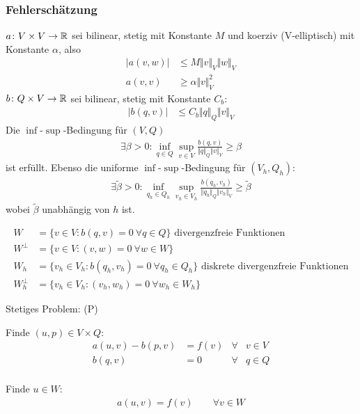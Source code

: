 \subsubsection*{Fehlerschätzung}
$a\colon V\times V\to\mathbb{R}$ sei bilinear, stetig mit Konstante $M$ und koerziv (V-elliptisch) mit Konstante $\alpha$, also
\begin{align*}
	\big|a(v,w)\big|&\leq M\Vert v\Vert_V\Vert w\Vert_V\\
	a(v,v)&\geq\alpha\Vert v\Vert_V^2
\end{align*}
$b\colon Q\times V\to\mathbb{R}$ sei bilinear, stetig mit Konstante $C_b$:
\begin{align*}
	\big|b(q,v)\big|&\leq C_b\Vert q\Vert_Q\Vert v\Vert_V
\end{align*}
Die $\inf$-$\sup$-Bedingung für $(V,Q)$
\begin{align*}
	\exists\beta>0:\inf\limits_{q\in Q}\sup\limits_{v\in V}\frac{b(q,v)}{\Vert q\Vert_Q\Vert v\Vert_V}\geq\beta
\end{align*}
ist erfüllt. Ebenso die uniforme $\inf$-$\sup$-Bedingung für $(V_h,Q_h)$:
\begin{align*}
	\exists\tilde{\beta}>0:\inf\limits_{q_h\in Q_h}\sup\limits_{v_h\in V_h}\frac{b(q_h,v_h)}{\Vert q_h\Vert_Q\Vert v_h\Vert_V}\geq\tilde{\beta}
\end{align*}
wobei $\tilde{\beta}$ unabhängig von $h$ ist.

\begin{align*}
	W&=\Big\lbrace v\in V:b(q,v)=0~\forall q\in Q\Big\rbrace\text{ divergenzfreie Funktionen}\\
	W^\perp&=\Big\lbrace v\in V:(v,w)=0~\forall w\in W\Big\rbrace\\
	W_h&=\Big\lbrace v_h\in V_h:b(q_h,v_h)=0~\forall q_h\in Q_h\Big\rbrace\text{ diskrete divergenzfreie Funktionen}\\
	W_h^\perp&=\Big\lbrace v_h\in V_h:(v_h,w_h)=0~\forall w_h\in W_h\Big\rbrace
\end{align*}

Stetiges Problem: (P)

\begin{minipage}[t]{0.49\textwidth}
	Finde $(u,p)\in V\times Q$:
	\begin{align*}
		a(u,v)-b(p,v)&=f(v) &\forall&v\in V\\
		b(q,v)&=0 &\forall& q\in Q\\
	\end{align*}
\end{minipage} %
\begin{minipage}[t]{0.49\textwidth}
	Finde $u\in W$:
	\begin{align*}
		a(u,v)=f(v)\qquad\forall v\in W
	\end{align*}
\end{minipage}

